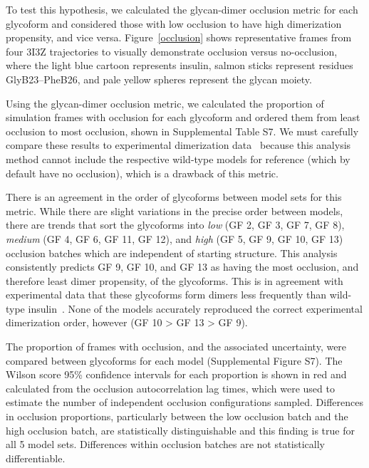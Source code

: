 \documentclass[9pt]{elife}
\begin{document}
To test this hypothesis, we calculated the glycan-dimer occlusion metric for each glycoform and considered those with low occlusion to have high dimerization propensity, and vice versa. Figure~\ref{occlusion} shows representative frames from four 3I3Z trajectories to visually demonstrate occlusion versus no-occlusion, where the light blue cartoon represents insulin, salmon sticks represent residues GlyB23--PheB26, and pale yellow spheres represent the glycan moiety. 

Using the glycan-dimer occlusion metric, we calculated the proportion of simulation frames with occlusion for each glycoform and ordered them from least occlusion to most occlusion, shown in Supplemental Table S7. We must carefully compare these results to experimental dimerization data~\cite{guan2018chemically} because this analysis method cannot include the respective wild-type models for reference (which by default have no occlusion), which is a drawback of this metric.

There is an agreement in the order of glycoforms between model sets for this metric. While there are slight variations in the precise order between models, there are trends that sort the glycoforms into \emph{low} (GF 2, GF 3, GF 7, GF 8), \emph{medium} (GF 4, GF 6, GF 11, GF 12), and \emph{high} (GF 5, GF 9, GF 10, GF 13) occlusion batches which are independent of starting structure. This analysis consistently predicts GF 9, GF 10, and GF 13 as having the most occlusion, and therefore least dimer propensity, of the glycoforms. This is in agreement with experimental data that these glycoforms form dimers less frequently than wild-type insulin~\cite{guan2018chemically}. None of the models accurately reproduced the correct experimental dimerization order, however (GF 10 > GF 13 > GF 9).

The proportion of frames with occlusion, and the associated uncertainty, were compared between glycoforms for each model (Supplemental Figure S7). The Wilson score 95\% confidence intervals for each proportion is shown in red and calculated from the occlusion autocorrelation lag times, which were used to estimate the number of independent occlusion configurations sampled. Differences in occlusion proportions, particularly between the low occlusion batch and the high occlusion batch, are statistically distinguishable and this finding is true for all 5 model sets. Differences within occlusion batches are not statistically differentiable.
\end{document}
